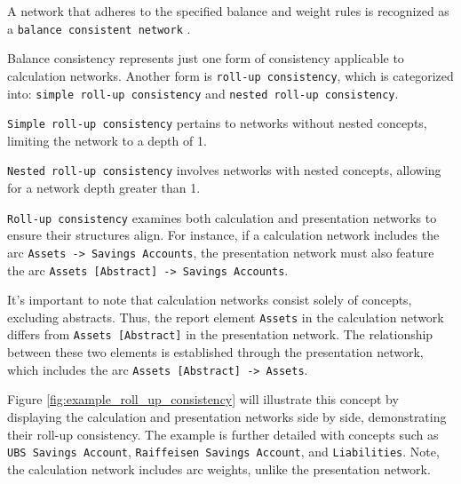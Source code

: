 
A network that adheres to the specified balance and weight rules is recognized as a \texttt{balance consistent network} \cite{fourny2023xbrl}.

\label{sec:roll_up_consistency}  
Balance consistency represents just one form of consistency applicable to calculation networks.  
Another form is \texttt{roll-up consistency}, which is categorized into: \texttt{simple roll-up consistency} and \texttt{nested roll-up consistency}.  

\texttt{Simple roll-up consistency} pertains to networks without nested concepts, limiting the network to a depth of 1.  

\texttt{Nested roll-up consistency} involves networks with nested concepts, allowing for a network depth greater than 1.  

\texttt{Roll-up consistency} examines both calculation and presentation networks to ensure their structures align.  
For instance, if a calculation network includes the arc \texttt{Assets -> Savings Accounts},  
the presentation network must also feature the arc \texttt{Assets [Abstract] -> Savings Accounts}.  

It's important to note that calculation networks consist solely of concepts, excluding abstracts.  
Thus, the report element \texttt{Assets} in the calculation network differs from \texttt{Assets [Abstract]} in the presentation network.  
The relationship between these two elements is established through the presentation network, which includes the arc \texttt{Assets [Abstract] -> Assets}.  

Figure \ref{fig:example_roll_up_consistency} will illustrate this concept by displaying the calculation and presentation networks side by side,  
demonstrating their roll-up consistency.  
The example is further detailed with concepts such as \texttt{UBS Savings Account}, \texttt{Raiffeisen Savings Account}, and \texttt{Liabilities}.  
Note, the calculation network includes arc weights, unlike the presentation network.

